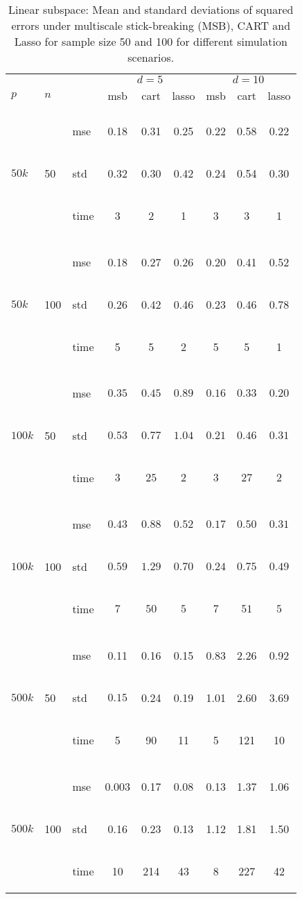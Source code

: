 \documentclass{article} %
\newcommand{\efoo}{\end{footnotesize}}
\newcommand{\bfoo}{\begin{footnotesize}}
\begin{document}
\begin{table}[t]
\caption{Linear subspace: Mean and standard deviations of squared errors under multiscale stick-breaking (MSB), CART and Lasso for sample size 50 and 100 for different simulation scenarios.}\label{table:linear1}
\vskip 0.15in
\begin{center}
\begin{small}
\begin{sc}
\begin{tabular}{lllcccccc}
\hline
&&&\multicolumn{3}{c}{$d=5$}&\multicolumn{3}{c}{$d=10$}\\
$p$&$n$& & msb&cart&lasso & msb&cart&lasso \\
\\
\multirow{3}{*}{$50k$}&\multirow{3}{*}{50}&\bfoo mse\efoo&0.18&0.31&0.25&0.22&0.58&0.22\\
&&\bfoo std\efoo &0.32&0.30&0.42&0.24&0.54&0.30\\
&&\bfoo time\efoo &3&2&1&3&3&1\\

\\
\multirow{3}{*}{$50k$}&\multirow{3}{*}{100}&\bfoo mse\efoo&0.18&0.27&0.26&0.20&0.41&0.52\\
&&\bfoo std\efoo & 0.26&0.42&0.46&0.23&0.46&0.78\\
&&\bfoo time\efoo &5&5& 2&5&5&1\\

\\
\multirow{3}{*}{$100k$}&\multirow{3}{*}{50}&\bfoo mse\efoo&$0.35$&$0.45$&$0.89$&$0.16$&$0.33$&$0.20$\\
&&\bfoo std\efoo &$0.53$ &$0.77$&$1.04$&$0.21$&$0.46$&$0.31$\\
&&\bfoo time\efoo &$3$&$25$&$2$&$3$&$27$&$2$\\
\\
\multirow{3}{*}{$100k$}&\multirow{3}{*}{100}&\bfoo mse\efoo&$0.43$&$0.88$&$0.52$&$0.17$&$0.50$&$0.31$\\
&&\bfoo std\efoo &$0.59$ &$1.29$&$0.70$&$0.24$ &$0.75$&$0.49$\\
&&\bfoo time\efoo &$7$&$50$&$5$&$7$&$51$&$5$\\
\\
\multirow{3}{*}{$500k$}&\multirow{3}{*}{50}&\bfoo mse\efoo&0.11&0.16&0.15&0.83&2.26&0.92\\
&&\bfoo std\efoo&$0.15$ &0.24&0.19&1.01&2.60&3.69\\
&&\bfoo time\efoo &5&90&11&5&121&10\\


\\
\multirow{3}{*}{$500k$}&\multirow{3}{*}{100}&\bfoo mse\efoo&0.003&0.17&0.08&0.13&1.37&1.06\\
&&\bfoo std\efoo &0.16&0.23&0.13&1.12&1.81&1.50\\
&&\bfoo time\efoo &10&214&43&8&227&42\\


\end{tabular}
\end{sc}
\end{small}
\end{center}
\end{table}
\end{document}
